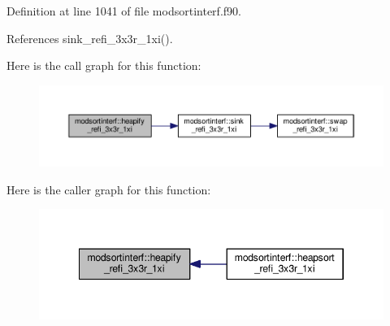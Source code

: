 Definition at line 1041 of file modsortinterf.\-f90.



References sink\-\_\-refi\-\_\-3x3r\-\_\-1xi().



Here is the call graph for this function\-:\nopagebreak
\begin{figure}[H]
\begin{center}
\leavevmode
\includegraphics[width=350pt]{classmodsortinterf_a9f5b12ccf35aeeb51dbc5e91f8bf5e69_cgraph}
\end{center}
\end{figure}




Here is the caller graph for this function\-:\nopagebreak
\begin{figure}[H]
\begin{center}
\leavevmode
\includegraphics[width=346pt]{classmodsortinterf_a9f5b12ccf35aeeb51dbc5e91f8bf5e69_icgraph}
\end{center}
\end{figure}


